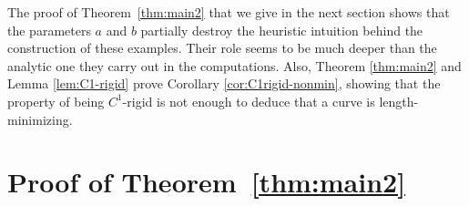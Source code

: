 \documentclass[12pt]{amsart}
\theoremstyle{plain}
\theoremstyle{definition}
\theoremstyle{remark}
\numberwithin{equation}{section}
\newcommand{\<}{\langle}
\renewcommand{\>}{\rangle}
\newcommand{\0}{\theta}
\newcommand{\1}{{-1}}
\renewcommand{\=}{\coloneqq}
\renewcommand{\.}{\dots}
\renewcommand{\-}{\cdot}
\renewcommand{\:}{\,:\,}
\theoremstyle{definition}
\begin{document}
The proof of Theorem~\ref{thm:main2} that we give in the next section shows that the parameters $a$ and $b$ partially destroy the heuristic intuition behind the construction of these examples. Their role seems to be much deeper than the analytic one they carry out in the computations. Also, Theorem \ref{thm:main2} and Lemma \ref{lem:C1-rigid} prove Corollary \ref{cor:C1rigid-nonmin}, showing that the property of being $C^1$-rigid is not enough to deduce that a curve is length-minimizing.




































































































\section{Proof of Theorem~\ref{thm:main2}}
\end{document}
